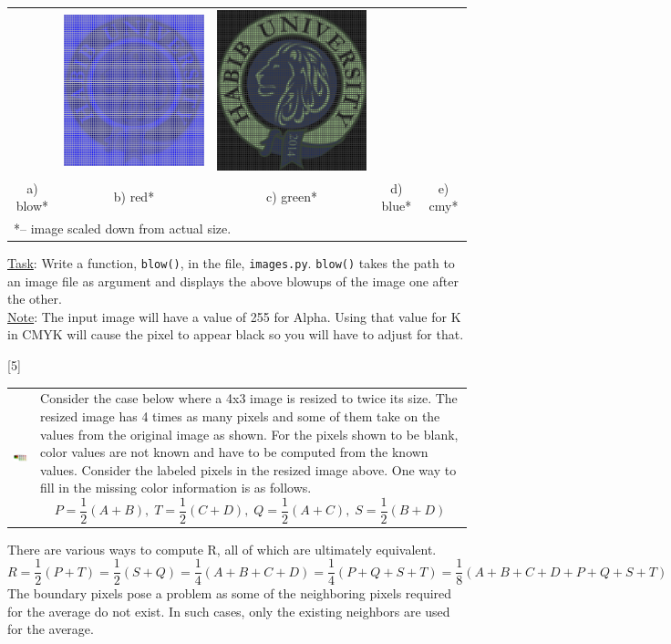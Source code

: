 \documentclass[addpoints]{exam}
\begin{document}
\begin{questions}
\begin{center}
\begin{tabular}{*{5}{c}}
      & \includegraphics[width=.16\textwidth]{logo-b}
      & \includegraphics[width=.16\textwidth]{logo-cmy}
      \\ a) blow* & b) red* & c) green* & d) blue* & e) cmy*
      \\\multicolumn{5}{l}{*-- image scaled down from actual size.}
    \end{tabular}
  \end{center}
  \underline{Task}: Write a function, \texttt{blow()}, in the file, \texttt{images.py}. \texttt{blow()} takes the path to an image file as argument and displays the above blowups of the image one after the other.\\
  \underline{Note}: The input image will have a value of 255 for Alpha. Using that value for K in CMYK will cause the pixel to appear black so you will have to adjust for that. 
  
[5]
  \noindent
  \begin{tabularx}{\textwidth}{lX}
    \includegraphics[width=.4\textwidth, align=t]{resize}
    & 
      Consider the case below where a 4x3 image is resized to twice its size. The resized image has 4 times as many pixels and some of them take on the values from the original image as shown. For the pixels shown to be blank, color values are not known and have to be computed from the known values. 
      Consider the labeled pixels in the resized image above. One way to fill in the missing color information is as follows.
      \[
      P = \frac{1}{2}(A + B),\; T = \frac{1}{2}(C + D),\; Q = \frac{1}{2}(A + C),\; S = \frac{1}{2}(B + D)
      \]
  \end{tabularx}
  There are various ways to compute R, all of which are ultimately equivalent.
  \[
    R = \frac{1}{2}(P + T) = \frac{1}{2}(S + Q) =  \frac{1}{4}(A + B + C + D) = \frac{1}{4}(P + Q + S + T) = \frac{1}{8}(A + B + C + D + P + Q + S + T)
  \]
  The boundary pixels pose a problem as some of the neighboring pixels required for the average do not exist. In such cases, only the existing neighbors are used for the average.


\end{questions}
\end{document}
